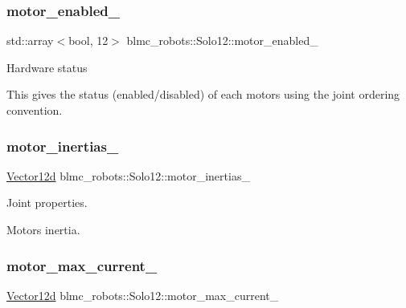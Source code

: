 \subsubsection{\texorpdfstring{motor\+\_\+enabled\+\_\+}{motor\_enabled\_}}
{\footnotesize\ttfamily std\+::array$<$bool, 12$>$ blmc\+\_\+robots\+::\+Solo12\+::motor\+\_\+enabled\+\_\+\hspace{0.3cm}{\ttfamily [private]}}





 Hardware status 

This gives the status (enabled/disabled) of each motors using the joint ordering convention. \mbox{\label{classblmc__robots_1_1Solo12_a625a9e4fe0be2fcad91a670d12f18bf3}} 
\subsubsection{\texorpdfstring{motor\+\_\+inertias\+\_\+}{motor\_inertias\_}}
{\footnotesize\ttfamily \hyperlink{common__header_8hpp_a80313eb420184518596e745eecf4b494}{Vector12d} blmc\+\_\+robots\+::\+Solo12\+::motor\+\_\+inertias\+\_\+\hspace{0.3cm}{\ttfamily [private]}}



Joint properties. 

Motors inertia. \mbox{\label{classblmc__robots_1_1Solo12_a46cab41a223dc4ee824e6d192cc01f9d}} 
\subsubsection{\texorpdfstring{motor\+\_\+max\+\_\+current\+\_\+}{motor\_max\_current\_}}
{\footnotesize\ttfamily \hyperlink{common__header_8hpp_a80313eb420184518596e745eecf4b494}{Vector12d} blmc\+\_\+robots\+::\+Solo12\+::motor\+\_\+max\+\_\+current\+\_\+\hspace{0.3cm}{\ttfamily [private]}}



